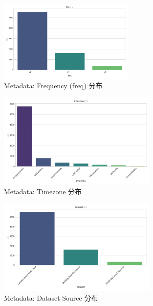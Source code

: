 \documentclass{article} %
\begin{document}
\begin{figure}[H]
    \centering
    \includegraphics[width=0.6\textwidth]{../plots/metadata_dist_freq.png}
    \caption{Metadata: Frequency (freq) 分布}
    \label{fig:metadata_dist_freq}
\end{figure}

\begin{figure}[H]
    \centering
    \includegraphics[width=0.7\textwidth]{../plots/metadata_dist_timezone.png}
    \caption{Metadata: Timezone 分布}
    \label{fig:metadata_dist_timezone}
\end{figure}

\begin{figure}[H]
    \centering
    \includegraphics[width=0.7\textwidth]{../plots/metadata_dist_dataset.png}
    \caption{Metadata: Dataset Source 分布}
    \label{fig:metadata_dist_dataset}
\end{figure}
\end{document}
